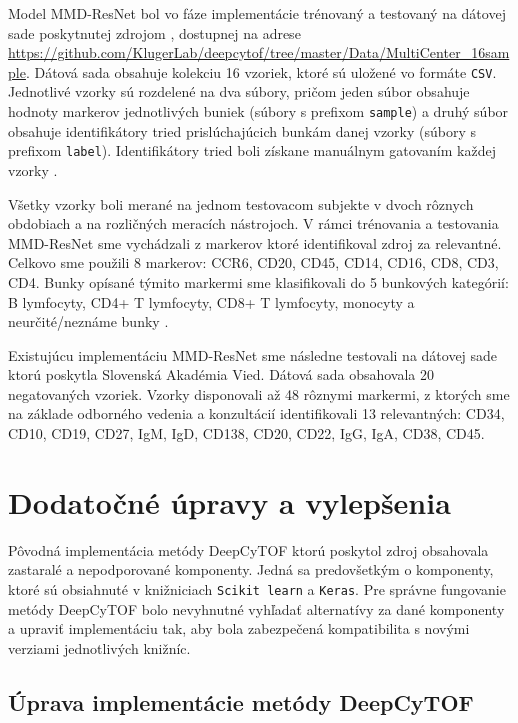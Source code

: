 Model MMD-ResNet bol vo fáze implementácie trénovaný a testovaný na dátovej sade poskytnutej zdrojom \cite{Li2017}, dostupnej na adrese \url{https://github.com/KlugerLab/deepcytof/tree/master/Data/MultiCenter_16sample}. Dátová sada obsahuje kolekciu 16 vzoriek, ktoré sú uložené vo formáte \texttt{CSV}. Jednotlivé vzorky sú rozdelené na dva súbory, pričom jeden súbor obsahuje hodnoty markerov jednotlivých buniek (súbory s prefixom \texttt{sample}) a druhý súbor obsahuje identifikátory tried prislúchajúcich bunkám danej vzorky (súbory s prefixom \texttt{label}). Identifikátory tried boli získane manuálnym gatovaním každej vzorky \cite{Li2017}. 

Všetky vzorky boli merané na jednom testovacom subjekte v dvoch rôznych obdobiach a na rozličných meracích nástrojoch. V rámci trénovania a testovania MMD-ResNet sme vychádzali z markerov ktoré identifikoval zdroj \cite{Li2017} za relevantné. Celkovo sme použili 8 markerov: CCR6, CD20, CD45, CD14, CD16, CD8, CD3, CD4. Bunky opísané týmito markermi sme klasifikovali do 5 bunkových kategórií: B lymfocyty, CD4+ T lymfocyty, CD8+ T lymfocyty, monocyty a neurčité/neznáme bunky \cite{Li2017}.

Existujúcu implementáciu MMD-ResNet sme následne testovali na dátovej sade ktorú poskytla Slovenská Akadémia Vied. Dátová sada obsahovala 20 negatovaných vzoriek. Vzorky disponovali až 48 rôznymi markermi, z ktorých sme na základe odborného vedenia a konzultácií identifikovali 13 relevantných: CD34, CD10, CD19, CD27, IgM, IgD, CD138, CD20, CD22, IgG, IgA, CD38, CD45.

\section{Dodatočné úpravy a vylepšenia}

Pôvodná implementácia metódy DeepCyTOF ktorú poskytol zdroj \cite{Li2017} obsahovala zastaralé a nepodporované komponenty. Jedná sa predovšetkým o komponenty, ktoré sú obsiahnuté v knižniciach \texttt{Scikit learn} a \texttt{Keras}. Pre správne fungovanie metódy DeepCyTOF bolo nevyhnutné vyhľadať alternatívy za dané komponenty a upraviť implementáciu tak, aby bola zabezpečená kompatibilita s novými verziami jednotlivých knižníc.

\subsection{Úprava implementácie metódy DeepCyTOF}

